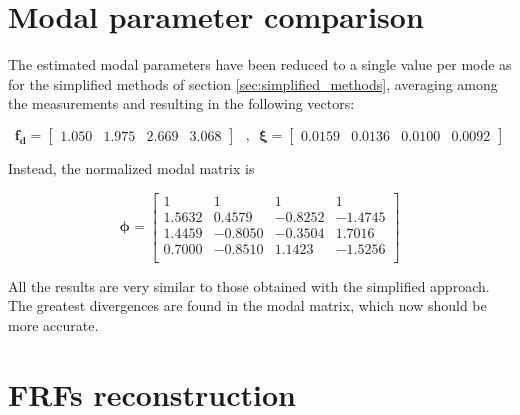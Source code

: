 \documentclass[a4paper,12pt,oneside]{article}
\begin{document}
\section{Modal parameter comparison}

The estimated modal parameters have been reduced to a single value per mode as for the simplified methods of section \ref{sec:simplified_methods}, averaging among the measurements and resulting in the following vectors:

\[
	\mathbf{f_d} =	\begin{bmatrix}
										1.050 & 1.975 & 2.669 & 3.068
									\end{bmatrix} \text{~ , ~}
		\bm{\xi} =	\begin{bmatrix}
									0.0159 & 0.0136 & 0.0100 & 0.0092
								\end{bmatrix}
\]

Instead, the normalized modal matrix is

\[
	\bm{\phi} =	\begin{bmatrix}
								1				& 1				& 1				& 1 \\
								1.5632	& 0.4579	& -0.8252	& -1.4745 \\
								1.4459	& -0.8050 & -0.3504	& 1.7016 \\
								0.7000	& -0.8510 & 1.1423	& -1.5256 \\
							\end{bmatrix}
\]

All the results are very similar to those obtained with the simplified approach. The greatest divergences are found in the modal matrix, which now should be more accurate.


\section{FRFs reconstruction}
\end{document}
